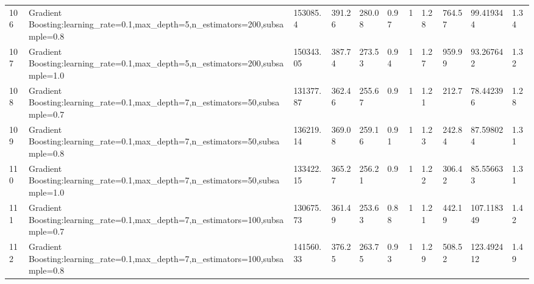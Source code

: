 \begin{longtable}{C{0.8cm} L{2cm} C{1.15cm} C{1.15cm} C{1.15cm} C{1.15cm} C{0.85cm} C{1.25cm} C{1.2cm} C{1.5cm} C{1.0cm}}
106 & Gradient Boosting:\newline learning\_rate=0.1,\newline max\_depth=5,\newline n\_estimators=200,\newline subsample=0.8 & 153085.4 & 391.26 & 280.08 & 0.97 & 1 & 1.28 & 764.57 & 99.419344 & 1.34 \\
107 & Gradient Boosting:\newline learning\_rate=0.1,\newline max\_depth=5,\newline n\_estimators=200,\newline subsample=1.0 & 150343.05 & 387.74 & 273.53 & 0.94 & 1 & 1.27 & 959.99 & 93.267642 & 1.32 \\
108 & Gradient Boosting:\newline learning\_rate=0.1,\newline max\_depth=7,\newline n\_estimators=50,\newline subsample=0.7 & 131377.87 & 362.46 & 255.67 & 0.9 & 1 & 1.21 & 212.7 & 78.442396 & 1.28 \\
109 & Gradient Boosting:\newline learning\_rate=0.1,\newline max\_depth=7,\newline n\_estimators=50,\newline subsample=0.8 & 136219.14 & 369.08 & 259.16 & 0.91 & 1 & 1.23 & 242.84 & 87.598024 & 1.31 \\
110 & Gradient Boosting:\newline learning\_rate=0.1,\newline max\_depth=7,\newline n\_estimators=50,\newline subsample=1.0 & 133422.15 & 365.27 & 256.21 & 0.9 & 1 & 1.22 & 306.42 & 85.556633 & 1.31 \\
111 & Gradient Boosting:\newline learning\_rate=0.1,\newline max\_depth=7,\newline n\_estimators=100,\newline subsample=0.7 & 130675.73 & 361.49 & 253.63 & 0.88 & 1 & 1.21 & 442.19 & 107.118349 & 1.42 \\
112 & Gradient Boosting:\newline learning\_rate=0.1,\newline max\_depth=7,\newline n\_estimators=100,\newline subsample=0.8 & 141560.33 & 376.25 & 263.75 & 0.93 & 1 & 1.29 & 508.52 & 123.492412 & 1.49 \\

\end{longtable}
